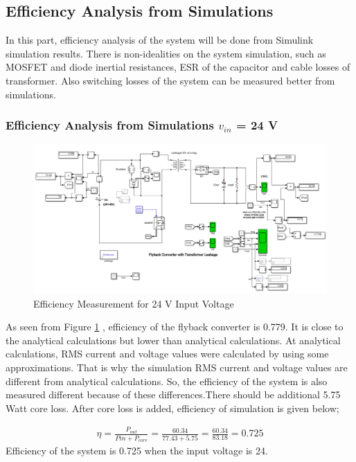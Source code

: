 \subsection{Efficiency Analysis from Simulations}

In this part, efficiency analysis of the system will be done from Simulink simulation results. There is non-idealities on the system simulation, such as MOSFET and diode inertial resistances, ESR of the capacitor and cable losses of transformer. Also switching losses of the system can be measured better from simulations.

\subsubsection{Efficiency Analysis from Simulations $v_{in}$ = 24 V}

\begin{figure}[H]
\begin{center}
\includegraphics[width=1\textwidth]{figures/24.PNG}
\caption{Efficiency Measurement for 24 V Input Voltage}
\label{fig:eff_24}
\end{center}
\end{figure}

As seen from Figure \ref{fig:eff_24} , efficiency of the flyback converter is 0.779. It is close to the analytical calculations but lower than analytical calculations. At analytical calculations, RMS current and voltage values were calculated by using some approximations. That is why the simulation RMS current and voltage values are different from analytical calculations. So, the efficiency of the system is also measured different because of these differences.There should be additional 5.75 Watt core loss. After core loss is added, efficiency of simulation is given below;

\begin{align}
    \eta = \frac{P_{out}}{P{in}+P_{core}} = \frac{60.34}{77.43+5.75} = \frac{60.34}{83.18} = 0.725
\end{align}
Efficiency of the system is 0.725 when the input voltage is 24.

